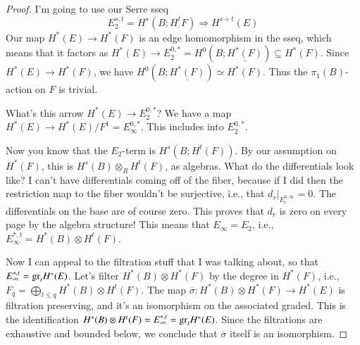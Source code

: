 \begin{proof}
    I'm going to use our Serre sseq
    $$
    E^{s,t}_2 = H^s(B;\underline{H^t F}) \Rightarrow H^{s+t}(E)
    $$
    Our map $H^\ast(E)\to H^\ast(F)$ is an edge homomorphism in the sseq, which means that it factors as $H^\ast(E)\to E^{0,\ast}_2 = H^0(B;\underline{H^\ast(F)}) \subseteq H^\ast(F)$.
    Since $H^\ast(E)\to H^\ast(F)$, we have $H^0(B;\underline{H^\ast(F)}) \simeq H^\ast(F)$.
    Thus the $\pi_1(B)$-action on $F$ is trivial.
    \begin{question}
	What's this arrow $H^\ast(E)\to E^{0,\ast}_2$?
	We have a map $H^\ast(E)\to H^\ast(E)/F^1 = E^{0,\ast}_\infty$.
	This includes into $E^{0,\ast}_2$.
    \end{question}
    Now you know that the $E_2$-term is $H^s(B;H^t(F))$.
    By our assumption on $H^\ast(F)$, this is $H^s(B)\otimes_R H^t(F)$, as algebras.
    What do the differentials look like?
    I can't have differentials coming off of the fiber, because if I did then the restriction map to the fiber wouldn't be surjective, i.e., that $d_r|_{E^{0,\infty}_r} = 0$.
    The differentials on the base are of course zero.
    This proves that $d_r$ is zero on every page by the algebra structure!
    This means that $E_\infty = E_2$, i.e., $E_\infty^{\ast,t} = H^\ast(B)\otimes H^t(F)$.

    Now I can appeal to the filtration stuff that I was talking about, so that $E^{\ast,t}_\infty = \mathrm{gr}_t H^\ast(E)$.
    Let's filter $H^\ast(B)\otimes H^\ast(F)$ by the degree in $H^\ast(F)$, i.e., $F_q = \bigoplus_{t\leq q} H^\ast(B)\otimes H^t(F)$.
    The map $\overline{\sigma}:H^\ast(B)\otimes H^\ast(F)\to H^\ast(E)$ is filtration preserving, and it's an isomorphism on the associated graded.
    This is the identification $H^\ast(B)\otimes H^t(F) = E^{\ast,t}_\infty = \mathrm{gr}_t H^\ast(E)$.
    Since the filtrations are exhaustive and bounded below, we conclude that $\overline{\sigma}$ itself is an isomorphism.
\end{proof}
